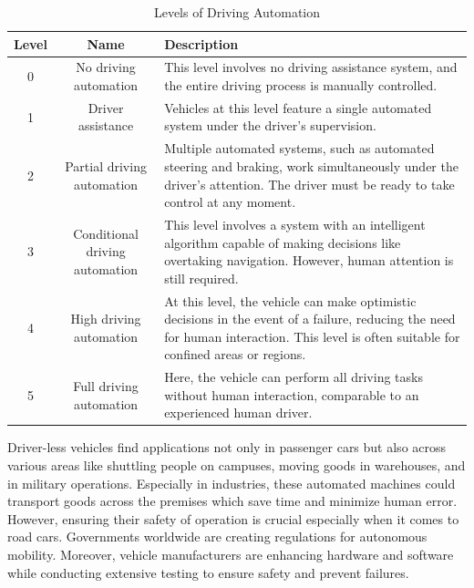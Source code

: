 \documentclass[12pt,twoside,a4paper,parskip]{scrbook} %
\begin{document}
\begin{table}[htbp]
  \centering
  
  \begin{minipage}{\linewidth}
    \renewcommand{\arraystretch}{1.3} 
    \begin{tabular}{|c|c|p{8cm}|}
      \hline
      \textbf{Level} & \textbf{Name} & \textbf{Description} \\
      \hline
      0 & No driving automation & This level involves no driving assistance system, and the entire driving process is manually controlled. \\
      \hline
      1 & Driver assistance & Vehicles at this level feature a single automated system under the driver's supervision. \\
      \hline
      2 & Partial driving automation & Multiple automated systems, such as automated steering and braking, work simultaneously under the driver's attention. The driver must be ready to take control at any moment. \\
      \hline
      3 & Conditional driving automation & This level involves a system with an intelligent algorithm capable of making decisions like overtaking navigation. However, human attention is still required. \\
      \hline
      4 & High driving automation & At this level, the vehicle can make optimistic decisions in the event of a failure, reducing the need for human interaction. This level is often suitable for confined areas or regions. \\
      \hline
      5 & Full driving automation & Here, the vehicle can perform all driving tasks without human interaction, comparable to an experienced human driver. \\
      \hline
    \end{tabular}
  \end{minipage}
  \caption{Levels of Driving Automation}
  \label{tab:automation-levels}
\end{table}

Driver-less vehicles find applications not only in passenger cars but also across various areas like shuttling people on campuses, moving goods in warehouses, and in military operations. Especially in industries, these automated machines could transport goods across the premises which save time and minimize human error. However, ensuring their safety of operation is crucial especially when it comes to road cars. Governments worldwide are creating regulations for autonomous mobility. Moreover, vehicle manufacturers are enhancing hardware and software while conducting extensive testing to ensure safety and prevent failures.
\end{document}
